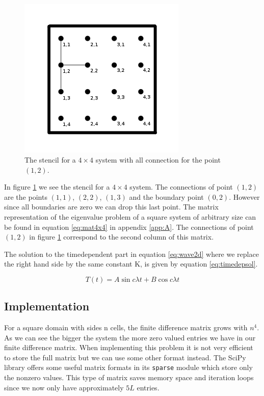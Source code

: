 \documentclass[a4paper]{article}
\begin{document}
\begin{figure}
\begin{centering}
\includegraphics[width=8cm]{stencil.png}
\caption{The stencil for a $4\times4$ system with all connection for the point $(1,2)$.}
\label{fig:stencil4x4}
\end{centering}
\end{figure}

In figure \ref{fig:stencil4x4} we see the stencil for a $4\times4$ system. The connections of point $(1,2)$ are the points $(1,1)$, $(2,2)$, $(1,3)$ and the boundary point $(0,2)$. However since all boundaries are zero we can drop this last point. The matrix representation  of the eigenvalue problem of a square system of arbitrary size can be found in equation \ref{eq:mat4x4} in appendix \ref{app:A}. The connections of point $(1,2)$ in figure \ref{fig:stencil4x4} correspond to the second column of this matrix. 

The solution to the timedependent part in equation \ref{eq:wave2d} where we replace the right hand side by the same constant K, is given by equation \ref{eq:timedepsol}.

\begin{equation}
T(t) = A\sin{c\lambda t} + B\cos{c\lambda t}
\label{eq:timedepsol}
\end{equation}


\subsection{Implementation}
For a square domain with sides n cells, the finite difference matrix grows with $n^4$. As we can see the bigger the system the more zero valued entries we have in our finite difference matrix. When implementing this problem it is not very efficient to store the full matrix but we can use some other format instead. The SciPy library \cite{scipy} offers some useful matrix formats in its \texttt{sparse} module which store only the nonzero values. This type of matrix saves memory space and iteration loops since we now only have approximately $5L$ entries. 
\end{document}
